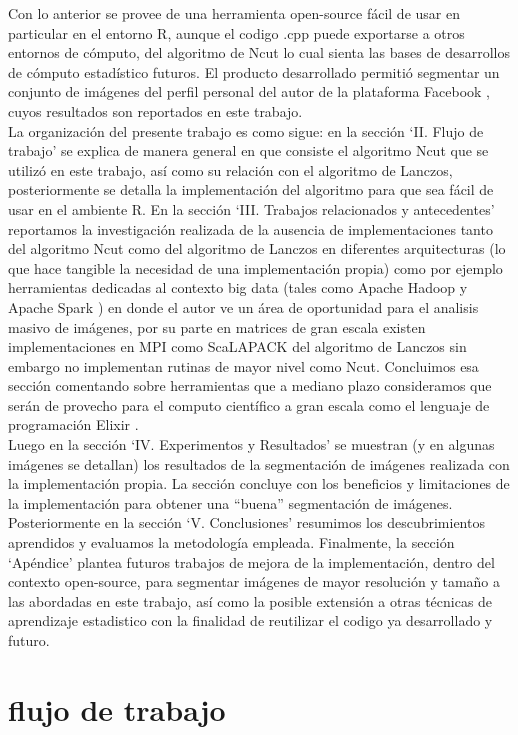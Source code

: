 \documentclass[conference]{IEEEtran}
\begin{document}
Con lo anterior se provee de una herramienta open-source fácil de usar en particular en el entorno R, aunque el codigo .cpp puede exportarse a otros entornos de cómputo, del algoritmo de Ncut lo cual sienta las bases de desarrollos de cómputo estadístico futuros. El producto desarrollado permitió segmentar un conjunto de imágenes del perfil personal del autor de la plataforma Facebook \cite{Facebook}, cuyos resultados son reportados en este trabajo.\\
La organización del presente trabajo es como sigue: en la sección ‘II. Flujo de trabajo’ se explica de manera general en que consiste el algoritmo Ncut que se utilizó en este trabajo, así como su relación con el algoritmo de Lanczos, posteriormente se detalla la implementación del algoritmo para que sea fácil de usar en el ambiente R.  En la sección ‘III. Trabajos relacionados y antecedentes’ reportamos la investigación realizada de la ausencia de implementaciones tanto del algoritmo Ncut como del algoritmo de Lanczos en diferentes arquitecturas (lo que hace tangible la necesidad de una implementación propia) como por ejemplo herramientas dedicadas al contexto big data (tales como Apache Hadoop \cite{Hadoop} y Apache Spark \cite{Spark}) en donde el autor ve un área de oportunidad para el analisis masivo de imágenes, por su parte en matrices de gran escala existen implementaciones en MPI como ScaLAPACK \cite{ScaLAPACK} del algoritmo de Lanczos sin embargo no implementan rutinas de mayor nivel como Ncut. Concluimos esa sección comentando sobre herramientas que a mediano plazo consideramos que serán de provecho para el computo científico a gran escala como el lenguaje de programación Elixir \cite{Elixir}. \\
Luego en la sección ‘IV. Experimentos y Resultados’ se muestran (y en algunas imágenes se detallan) los resultados de la segmentación de imágenes realizada con la implementación propia. La sección concluye con los beneficios y limitaciones de la implementación para obtener una “buena” segmentación de imágenes. Posteriormente en la sección ‘V. Conclusiones’ resumimos los descubrimientos aprendidos y evaluamos la metodología empleada. Finalmente, la sección ‘Apéndice’ plantea futuros trabajos de mejora de la implementación, dentro del contexto open-source, para segmentar imágenes de mayor resolución y tamaño a las abordadas en este trabajo, así como la posible extensión a otras técnicas de aprendizaje estadistico con la finalidad de reutilizar el codigo ya desarrollado y futuro.\\
\section{flujo de trabajo}
\end{document}
